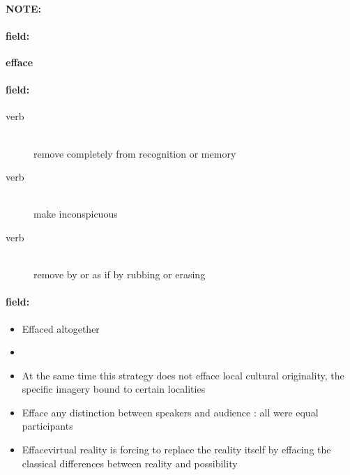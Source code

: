 \documentclass[12pt]{article}
\newenvironment{note}{\paragraph{NOTE:}}{}
\newenvironment{field}{\paragraph{field:}}{}
\begin{document}
\begin{note}
\begin{field}
\textbf{\large efface}
\end{field}


\begin{field}
\begin{description}
\item[verb] \hfill \\ 
remove completely from recognition or memory

\item[verb] \hfill \\ 
make inconspicuous

\item[verb] \hfill \\ 
remove by or as if by rubbing or erasing

\end{description}
\end{field}

\begin{field}
\begin{itemize}
\item Effaced altogether
\item 
\item At the same time this strategy does not efface local cultural originality, the specific imagery bound to certain localities
\item Efface any distinction between speakers and audience : all were equal participants
\item Effacevirtual reality is forcing to replace the reality itself by effacing the classical differences between reality and possibility
\end{itemize}
\end{field}
\end{note}
\end{document}
